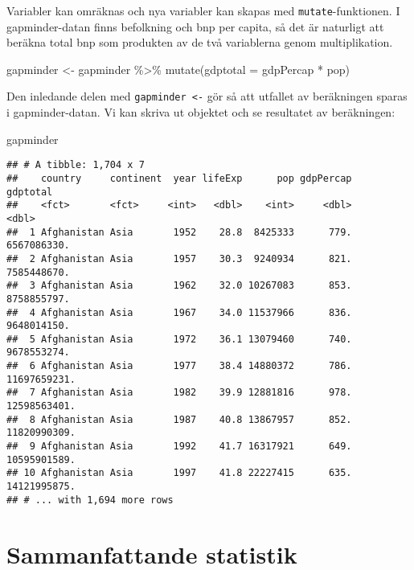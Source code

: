 \documentclass[
]{book}
\newenvironment{Shaded}{\begin{snugshade}}{\end{snugshade}}
\newcommand{\AttributeTok}[1]{\textcolor[rgb]{0.77,0.63,0.00}{#1}}
\newcommand{\FunctionTok}[1]{\textcolor[rgb]{0.00,0.00,0.00}{#1}}
\newcommand{\NormalTok}[1]{#1}
\newcommand{\OtherTok}[1]{\textcolor[rgb]{0.56,0.35,0.01}{#1}}
\newcommand{\SpecialCharTok}[1]{\textcolor[rgb]{0.00,0.00,0.00}{#1}}
\theoremstyle{definition}
\theoremstyle{definition}
\theoremstyle{definition}
\theoremstyle{definition}
\theoremstyle{remark}
\begin{document}
Variabler kan omräknas och nya variabler kan skapas med \texttt{mutate}-funktionen. I gapminder-datan finns befolkning och bnp per capita, så det är naturligt att beräkna total bnp som produkten av de två variablerna genom multiplikation.

\begin{Shaded}
\begin{Highlighting}[]
\NormalTok{gapminder }\OtherTok{\textless{}{-}}\NormalTok{ gapminder }\SpecialCharTok{\%\textgreater{}\%} 
  \FunctionTok{mutate}\NormalTok{(}\AttributeTok{gdptotal =}\NormalTok{ gdpPercap }\SpecialCharTok{*}\NormalTok{ pop)}
\end{Highlighting}
\end{Shaded}

Den inledande delen med \texttt{gapminder\ \textless{}-} gör så att utfallet av beräkningen sparas i gapminder-datan.
Vi kan skriva ut objektet och se resultatet av beräkningen:

\begin{Shaded}
\begin{Highlighting}[]
\NormalTok{gapminder}
\end{Highlighting}
\end{Shaded}

\begin{verbatim}
## # A tibble: 1,704 x 7
##    country     continent  year lifeExp      pop gdpPercap     gdptotal
##    <fct>       <fct>     <int>   <dbl>    <int>     <dbl>        <dbl>
##  1 Afghanistan Asia       1952    28.8  8425333      779.  6567086330.
##  2 Afghanistan Asia       1957    30.3  9240934      821.  7585448670.
##  3 Afghanistan Asia       1962    32.0 10267083      853.  8758855797.
##  4 Afghanistan Asia       1967    34.0 11537966      836.  9648014150.
##  5 Afghanistan Asia       1972    36.1 13079460      740.  9678553274.
##  6 Afghanistan Asia       1977    38.4 14880372      786. 11697659231.
##  7 Afghanistan Asia       1982    39.9 12881816      978. 12598563401.
##  8 Afghanistan Asia       1987    40.8 13867957      852. 11820990309.
##  9 Afghanistan Asia       1992    41.7 16317921      649. 10595901589.
## 10 Afghanistan Asia       1997    41.8 22227415      635. 14121995875.
## # ... with 1,694 more rows
\end{verbatim}

\hypertarget{sammanfattande-statistik}{%
\section{Sammanfattande statistik}\label{sammanfattande-statistik}}
\end{document}
